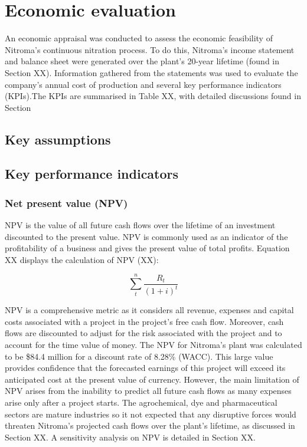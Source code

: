 \section{Economic evaluation}
An economic appraisal was conducted to assess the economic feasibility of Nitroma’s continuous nitration process. To do this, Nitroma’s income statement and balance sheet were generated over the plant’s 20-year lifetime (found in Section XX). Information gathered from the statements was used to evaluate the company’s annual cost of production and several key performance indicators (KPIs).The KPIs are summarised in Table XX, with detailed discussions found in Section

\subsection{Key assumptions}

\subsection{Key performance indicators}

\subsubsection{Net present value (NPV)}
NPV is the value of all future cash flows over the lifetime of an investment discounted to the present value. NPV is commonly used as an indicator of the profitability of a business and gives the present value of total profits. Equation XX displays the calculation of NPV (XX):

\begin{equation}
\label{eqn:npv}
    \sum_t^n\frac{R_{t}}{(1+i)^{t}}
\end{equation}

NPV is a comprehensive metric as it considers all revenue, expenses and capital costs associated with a project in the project’s free cash flow. Moreover, cash flows are discounted to adjust for the risk associated with the project and to account for the time value of money. The NPV for Nitroma’s plant was calculated to be \$84.4 million for a discount rate of 8.28\% (WACC). This large value provides confidence that the forecasted earnings of this project will exceed its anticipated cost at the present value of currency. However, the main limitation of NPV arises from the inability to predict all future cash flows as many expenses arise only after a project starts. The agrochemical, dye and pharmaceutical sectors are mature industries so it not expected that any disruptive forces would threaten Nitroma’s projected cash flows over the plant’s lifetime, as discussed in Section XX. A sensitivity analysis on NPV is detailed in Section XX. 


